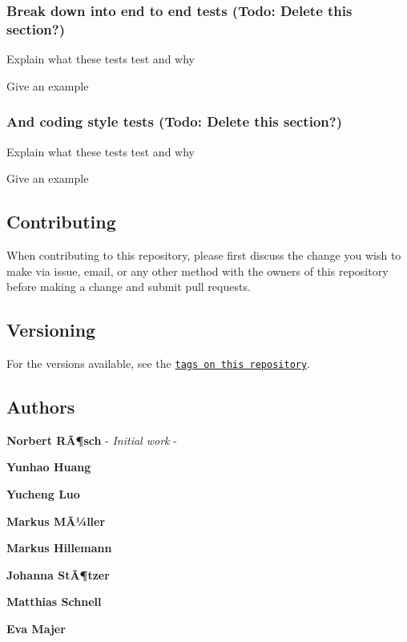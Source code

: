 \subsubsection*{Break down into end to end tests (Todo\+: Delete this section?)}

Explain what these tests test and why


\begin{DoxyCode}
Give an example
\end{DoxyCode}


\subsubsection*{And coding style tests (Todo\+: Delete this section?)}

Explain what these tests test and why


\begin{DoxyCode}
Give an example
\end{DoxyCode}


\subsection*{Contributing}

When contributing to this repository, please first discuss the change you wish to make via issue, email, or any other method with the owners of this repository before making a change and submit pull requests.

\subsection*{Versioning}

For the versions available, see the \href{https://github.com/Course-OO-modeling/Trafo//tags}{\tt tags on this repository}.

\subsection*{Authors}


\begin{DoxyItemize}
\item {\bfseries Norbert RÃ¶sch} -\/ {\itshape Initial work} -\/
\item {\bfseries Yunhao Huang}
\item {\bfseries Yucheng Luo}
\item {\bfseries Markus MÃ¼ller}
\item {\bfseries Markus Hillemann}
\item {\bfseries Johanna StÃ¶tzer}
\item {\bfseries Matthias Schnell}
\item {\bfseries Eva Majer}
\end{DoxyItemize}


